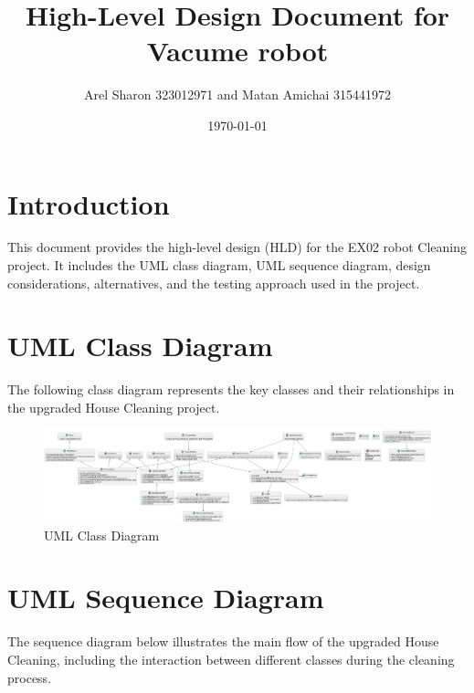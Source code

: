 \documentclass{article}
\title{High-Level Design Document for Vacume robot }
\author{Arel Sharon 323012971 and 
Matan Amichai 315441972}
\date{\today}
\begin{document}
\maketitle

\tableofcontents

\newpage

\section{Introduction}
This document provides the high-level design (HLD) for the EX02 robot Cleaning project. It includes the UML class diagram, UML sequence diagram, design considerations, alternatives, and the testing approach used in the project.

\section{UML Class Diagram}
The following class diagram represents the key classes and their relationships in the upgraded House Cleaning project.

\begin{figure}[h!]
    \centering
    \includegraphics[width=\textwidth,height=0.5\textheight,keepaspectratio]{Diagrams/output_directory/class_diagram.png}
    \caption{UML Class Diagram}
    \label{fig:class-diagram}
\end{figure}

\section{UML Sequence Diagram}
The sequence diagram below illustrates the main flow of the upgraded House Cleaning, including the interaction between different classes during the cleaning process.
\end{document}
